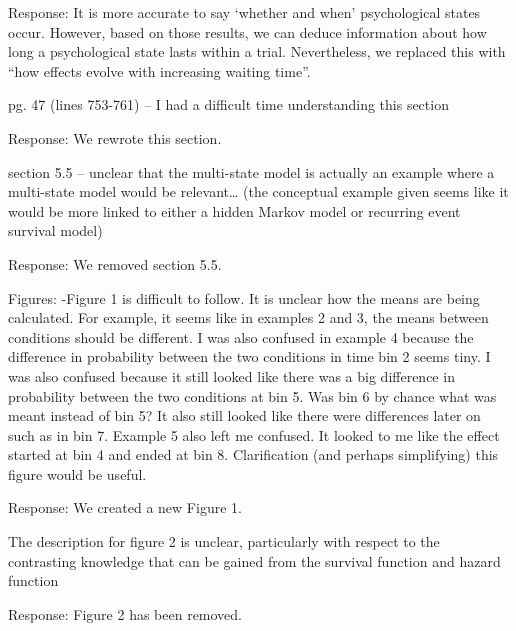 \documentclass[
]{article}
\renewenvironment{quote}{\begin{leftbar}}{\end{leftbar}}
\begin{document}
Response: It is more accurate to say `whether and when' psychological
states occur. However, based on those results, we can deduce information
about how long a psychological state lasts within a trial. Nevertheless,
we replaced this with ``how effects evolve with increasing waiting
time''.

\begin{quote}
pg. 47 (lines 753-761) -- I had a difficult time understanding this
section
\end{quote}

Response: We rewrote this section.

\begin{quote}
section 5.5 -- unclear that the multi-state model is actually an example
where a multi-state model would be relevant\ldots{} (the conceptual
example given seems like it would be more linked to either a hidden
Markov model or recurring event survival model)
\end{quote}

Response: We removed section 5.5.

\begin{quote}
Figures: -Figure 1 is difficult to follow. It is unclear how the means
are being calculated. For example, it seems like in examples 2 and 3,
the means between conditions should be different. I was also confused in
example 4 because the difference in probability between the two
conditions in time bin 2 seems tiny. I was also confused because it
still looked like there was a big difference in probability between the
two conditions at bin 5. Was bin 6 by chance what was meant instead of
bin 5? It also still looked like there were differences later on such as
in bin 7. Example 5 also left me confused. It looked to me like the
effect started at bin 4 and ended at bin 8. Clarification (and perhaps
simplifying) this figure would be useful.
\end{quote}

Response: We created a new Figure 1.

\begin{quote}
The description for figure 2 is unclear, particularly with respect to
the contrasting knowledge that can be gained from the survival function
and hazard function
\end{quote}

Response: Figure 2 has been removed.
\end{document}
